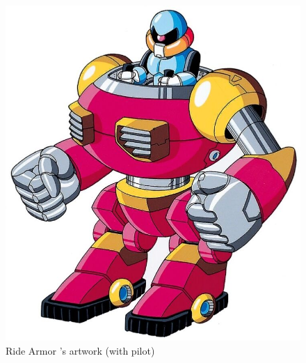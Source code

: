 \begin{itemize}
\begin{figure}[htp]
		\includegraphics[height=\portraitsize]{figures/X1/Enemies/ArmorSoldier.jpg}
		\caption{Ride Armor 's artwork (with pilot)}
	\end{figure}
	

\end{itemize}
